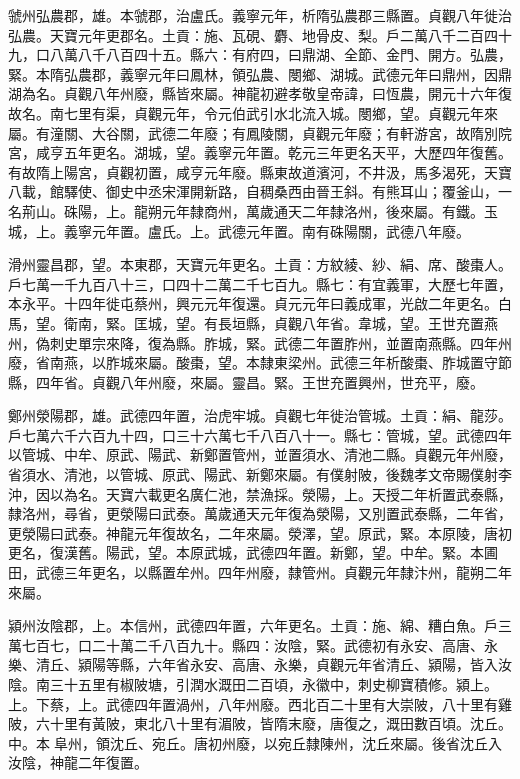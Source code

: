 \begin{pinyinscope}
 虢州弘農郡，雄。本虢郡，治盧氏。義寧元年，析隋弘農郡三縣置。貞觀八年徙治弘農。天寶元年更郡名。土貢：施、瓦硯、麝、地骨皮、梨。戶二萬八千二百四十九，口八萬八千八百四十五。縣六：有府四，曰鼎湖、全節、金門、開方。弘農，緊。本隋弘農郡，義寧元年曰鳳林，領弘農、閿鄉、湖城。武德元年曰鼎州，因鼎湖為名。貞觀八年州廢，縣皆來屬。神龍初避孝敬皇帝諱，曰恆農，開元十六年復故名。南七里有渠，貞觀元年，令元伯武引水北流入城。閿鄉，望。貞觀元年來屬。有潼關、大谷關，武德二年廢；有鳳陵關，貞觀元年廢；有軒游宮，故隋別院宮，咸亨五年更名。湖城，望。義寧元年置。乾元三年更名天平，大歷四年復舊。有故隋上陽宮，貞觀初置，咸亨元年廢。縣東故道濱河，不井汲，馬多渴死，天寶八載，館驛使、御史中丞宋渾開新路，自稠桑西由晉王斜。有熊耳山；覆釜山，一名荊山。硃陽，上。龍朔元年隸商州，萬歲通天二年隸洛州，後來屬。有鐵。玉城，上。義寧元年置。盧氏。上。武德元年置。南有硃陽關，武德八年廢。



 滑州靈昌郡，望。本東郡，天寶元年更名。土貢：方紋綾、紗、絹、席、酸棗人。戶七萬一千九百八十三，口四十二萬二千七百九。縣七：有宜義軍，大歷七年置，本永平。十四年徙屯蔡州，興元元年復還。貞元元年曰義成軍，光啟二年更名。白馬，望。衛南，緊。匡城，望。有長垣縣，貞觀八年省。韋城，望。王世充置燕州，偽刺史單宗來降，復為縣。胙城，緊。武德二年置胙州，並置南燕縣。四年州廢，省南燕，以胙城來屬。酸棗，望。本隸東梁州。武德三年析酸棗、胙城置守節縣，四年省。貞觀八年州廢，來屬。靈昌。緊。王世充置興州，世充平，廢。



 鄭州滎陽郡，雄。武德四年置，治虎牢城。貞觀七年徙治管城。土貢：絹、龍莎。戶七萬六千六百九十四，口三十六萬七千八百八十一。縣七：管城，望。武德四年以管城、中牟、原武、陽武、新鄭置管州，並置須水、清池二縣。貞觀元年州廢，省須水、清池，以管城、原武、陽武、新鄭來屬。有僕射陂，後魏孝文帝賜僕射李沖，因以為名。天寶六載更名廣仁池，禁漁採。滎陽，上。天授二年析置武泰縣，隸洛州，尋省，更滎陽曰武泰。萬歲通天元年復為滎陽，又別置武泰縣，二年省，更滎陽曰武泰。神龍元年復故名，二年來屬。滎澤，望。原武，緊。本原陵，唐初更名，復漢舊。陽武，望。本原武城，武德四年置。新鄭，望。中牟。緊。本圃田，武德三年更名，以縣置牟州。四年州廢，隸管州。貞觀元年隸汴州，龍朔二年來屬。



 潁州汝陰郡，上。本信州，武德四年置，六年更名。土貢：施、綿、糟白魚。戶三萬七百七，口二十萬二千八百九十。縣四：汝陰，緊。武德初有永安、高唐、永樂、清丘、潁陽等縣，六年省永安、高唐、永樂，貞觀元年省清丘、潁陽，皆入汝陰。南三十五里有椒陂塘，引潤水溉田二百頃，永徽中，刺史柳寶積修。潁上。上。下蔡，上。武德四年置渦州，八年州廢。西北百二十里有大崇陂，八十里有雞陂，六十里有黃陂，東北八十里有湄陂，皆隋末廢，唐復之，溉田數百頃。沈丘。中。本阜州，領沈丘、宛丘。唐初州廢，以宛丘隸陳州，沈丘來屬。後省沈丘入汝陰，神龍二年復置。




\end{pinyinscope}
